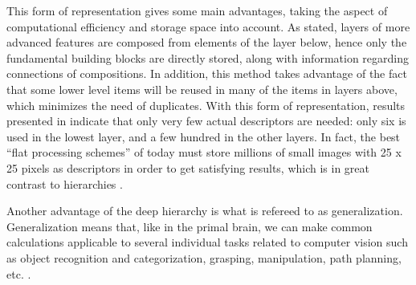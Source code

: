 This form of representation gives some main advantages,
taking the aspect of computational efficiency and storage space into account.
As stated, layers of more advanced features are composed from elements of the layer below,
hence only the fundamental building blocks are directly stored,
along with information regarding connections of compositions.
In addition, this method takes advantage of the fact that some lower level items
will be reused in many of the items in layers above, which minimizes the need of duplicates.
With this form of representation, results presented in \citet{fidler2009learning} indicate that
only very few actual descriptors are needed: only six is used in the lowest layer,
and a few hundred in the other layers.
In fact, the best “flat processing schemes” of today must store millions of small images
with 25 x 25 pixels as descriptors in order to get satisfying results,
which is in great contrast to hierarchies \citep{fidler2009learning}.

Another advantage of the deep hierarchy is what is refereed to as generalization.
Generalization means that, like in the primal brain,
we can make common calculations applicable to several individual tasks
related to computer vision such as object recognition and categorization,
grasping, manipulation, path planning, etc. \citep{kruger2013deep}.
